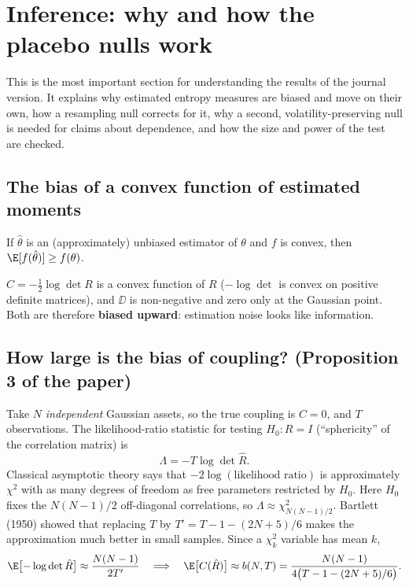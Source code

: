 \section{Inference: why and how the placebo nulls work}
\label{sec:temoin}

This is the most important section for understanding the results of the
journal version. It explains why estimated entropy measures are biased and
move on their own, how a resampling null corrects for it, why a second,
volatility-preserving null is needed for claims about dependence, and how the
size and power of the test are checked.

\subsection{The bias of a convex function of estimated moments}

\begin{lemme}
If $\hat\theta$ is an (approximately) unbiased estimator of $\theta$ and $f$
is convex, then $\E[f(\hat\theta)]\ge f(\theta)$.
\end{lemme}

\noindent $C=-\tfrac12\log\det R$ is a convex function of $R$ ($-\log\det$ is
convex on positive definite matrices), and $\DD$ is non-negative and zero only
at the Gaussian point. Both are therefore \textbf{biased upward}: estimation
noise looks like information.

\subsection{How large is the bias of coupling? (Proposition 3 of the paper)}

Take $N$ \emph{independent} Gaussian assets, so the true coupling is $C=0$,
and $T$ observations. The likelihood-ratio statistic for testing $H_0:R=I$
(``sphericity'' of the correlation matrix) is
\[
\Lambda=-T\log\det\hat R .
\]
Classical asymptotic theory says that $-2\log(\text{likelihood ratio})$ is
approximately $\chi^2$ with as many degrees of freedom as free parameters
restricted by $H_0$. Here $H_0$ fixes the $N(N-1)/2$ off-diagonal
correlations, so $\Lambda\approx\chi^2_{N(N-1)/2}$. Bartlett (1950) showed that
replacing $T$ by $T'=T-1-(2N+5)/6$ makes the approximation much better in
small samples. Since a $\chi^2_k$ variable has mean $k$,
\[
\E\bigl[-\log\det\hat R\bigr]\approx\frac{N(N-1)}{2T'}
\quad\Longrightarrow\quad
\E\bigl[C(\hat R)\bigr]\approx b(N,T)=\frac{N(N-1)}{4\bigl(T-1-(2N+5)/6\bigr)} .
\]

